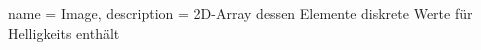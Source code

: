 {
  name = Image,
  description = {2D-Array dessen Elemente diskrete Werte für Helligkeits enthält} 
}
